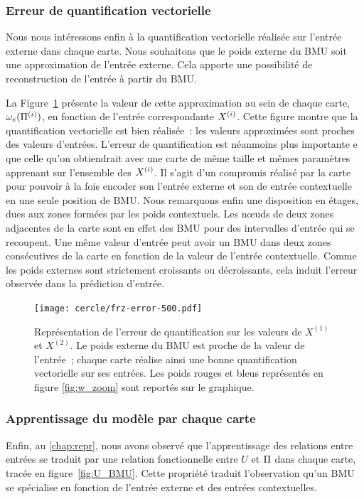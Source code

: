 \documentclass[../main]{subfiles}
\begin{document}
\subsubsection{Erreur de quantification vectorielle}

Nous nous intéressons enfin à la quantification vectorielle réalisée sur l'entrée externe dans chaque carte. 
Nous souhaitons que le poids externe du BMU soit une approximation de l'entrée externe. Cela apporte une possibilité de reconstruction de l'entrée à partir du BMU.

La Figure~\ref{fig:qv} présente la valeur de cette approximation au sein de chaque carte, $\omega_{e}(\Pi^{({i})})$, en fonction de l'entrée correspondante $X^{({i})}$. 
Cette figure montre que la quantification vectorielle est bien réalisée~: les valeurs approximées sont proches des valeurs d'entrées.
L'erreur de quantification est néanmoins plus importante e que celle qu'on obtiendrait avec une carte de même taille et mêmes paramètres apprenant sur l'ensemble des $X^{({i})}$. Il s'agit d'un compromis réalisé par la carte pour pouvoir à la fois encoder son l'entrée externe et son de entrée contextuelle en une seule position de BMU.
Nous remarquons enfin une disposition en étages, dues aux zones formées par les poids contextuels.
Les n\oe{}uds de deux zones adjacentes de la carte sont en effet des BMU pour des intervalles d'entrée qui se recoupent.
Une même valeur d'entrée peut avoir un BMU dans deux zones consécutives de la carte en fonction de la valeur de l'entrée contextuelle. Comme les poids externes sont strictement croissants ou décroissants, cela induit l'erreur observée dans la prédiction d'entrée.

\begin{figure}[h!]
	\centering\texttt{[image: cercle/frz-error-500.pdf]}
	\caption{Représentation de l'erreur de quantification sur les valeurs de $X^{(1)}$ et $X^{(2)}$. Le poids externe du BMU est proche de la valeur de l'entrée~; chaque carte réalise ainsi une bonne quantification vectorielle sur ses entrées. 
	Les poids rouges et bleus représentés en figure \ref{fig:w_zoom} sont reportés sur le graphique. \label{fig:qv}}
\end{figure}

\subsubsection{Apprentissage du modèle par chaque carte}

Enfin, au \ref{chap:repr}, nous avons observé que l'apprentissage des relations entre entrées se traduit par une relation fonctionnelle entre $U$ et $\Pi$ dans chaque carte, tracée en figure~\ref{fig:U_BMU}.
Cette propriété traduit l'observation qu'un BMU se spécialise en fonction de l'entrée externe et des entrées contextuelles.
\end{document}
